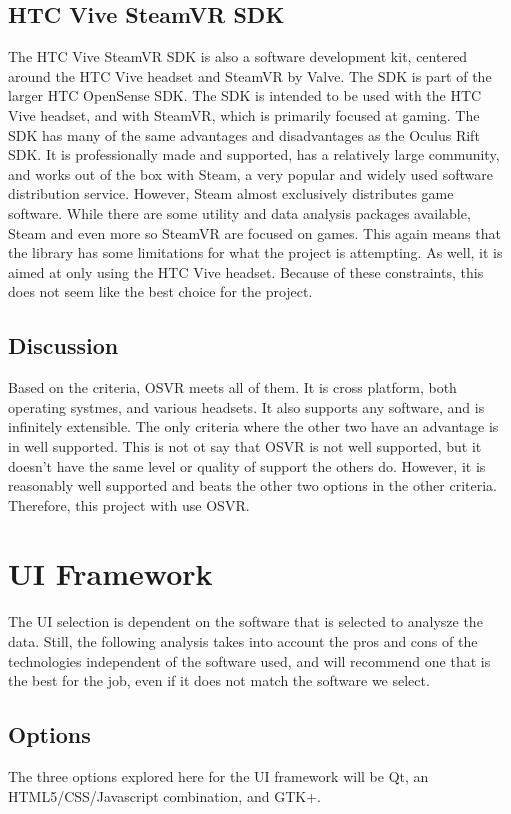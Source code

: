 \documentclass{article}
\begin{document}
\subsection{HTC Vive SteamVR SDK}

The HTC Vive SteamVR SDK is also a software development kit, centered around the HTC Vive headset
and SteamVR by Valve. The SDK is part of the larger HTC OpenSense SDK. The SDK is intended to be used
with the HTC Vive headset, and with SteamVR, which is primarily focused at gaming. The SDK has many
of the same advantages and disadvantages as the Oculus Rift SDK. It is professionally made and supported,
has a relatively large community, and works out of the box with Steam, a very popular and widely used
software distribution service. However, Steam almost exclusively distributes game software. While there
are some utility and data analysis packages available, Steam and even more so SteamVR are focused on
games. This again means that the library has some limitations for what the project is attempting. As well,
it is aimed at only using the HTC Vive headset. Because of these constraints, this does not seem like the
best choice for the project. \cite{htcsoft}

\subsection{Discussion}
Based on the criteria, OSVR meets all of them. It is cross platform, both operating systmes, and
various headsets. It also supports any software, and is infinitely extensible. The only criteria
where the other two have an advantage is in well supported. This is not ot say that OSVR is not
well supported, but it doesn't have the same level or quality of support the others do. However,
it is reasonably well supported and beats the other two options in the other criteria. Therefore,
this project with use OSVR.

\section{UI Framework}

The UI selection is dependent on the software that is selected to analysze the data. Still, the
following analysis takes into account the pros and cons of the technologies independent of the software
used, and will recommend one that is the best for the job, even if it does not match the software we 
select.

\subsection{Options}
The three options explored here for the UI framework will be Qt, an HTML5/CSS/Javascript combination,
and GTK+.
\end{document}
